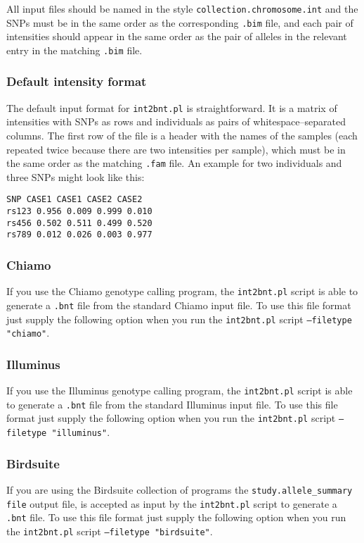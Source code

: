 \documentclass{article}
\begin{document}
All input files should be named in the style \texttt{collection.chromosome.int} and the SNPs must be in the same order as the corresponding \texttt{.bim} file, and each pair of intensities should appear in the same order as the pair of alleles in the relevant entry in the matching \texttt{.bim} file.

\subsubsection{Default intensity format}
The default input format for \texttt{int2bnt.pl} is straightforward. It is a matrix of intensities with SNPs as rows and individuals as pairs of whitespace--separated columns. The first row of the file is a header with the names of the samples (each repeated twice because there are two intensities per sample), which must be in the same order as the matching \texttt{.fam} file. An example for two individuals and three SNPs might look like this:

\begin{verbatim}
SNP CASE1 CASE1 CASE2 CASE2
rs123 0.956 0.009 0.999 0.010
rs456 0.502 0.511 0.499 0.520
rs789 0.012 0.026 0.003 0.977
\end{verbatim}

\subsubsection{Chiamo}
If you use the Chiamo genotype calling program, the \texttt{int2bnt.pl} script is able to generate a \texttt{.bnt} file from the standard Chiamo input file. To use this file format just supply the following option when you run the \texttt{int2bnt.pl} script \texttt{--filetype "chiamo"}.

\subsubsection{Illuminus}
If you use the Illuminus genotype calling program, the \texttt{int2bnt.pl} script is able to generate a \texttt{.bnt} file from the standard Illuminus input file. To use this file format just supply the following option when you run the \texttt{int2bnt.pl} script \texttt{--filetype "illuminus"}.

\subsubsection{Birdsuite}
If you are using the Birdsuite collection of programs the \texttt{study.allele\_summary file} output file, is accepted as input by the \texttt{int2bnt.pl} script to generate a \texttt{.bnt} file. To use this file format just supply the following option when you run the \texttt{int2bnt.pl} script \texttt{--filetype "birdsuite"}.
\end{document}
